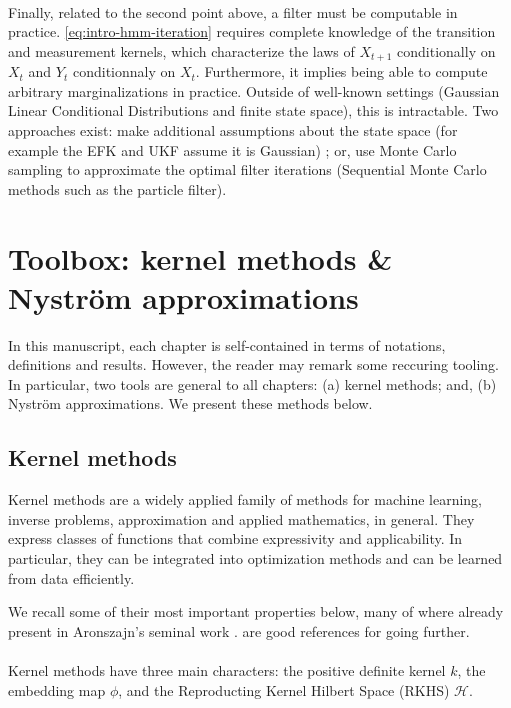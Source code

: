 \paragraph{} Finally, related to the second point above, a filter must be computable in practice. \cref{eq:intro-hmm-iteration} requires complete knowledge of the transition and measurement kernels, which characterize the laws of $X_{t+1}$ conditionally on $X_t$ and $Y_t$ conditionnaly on $X_t$. Furthermore, it implies being able to compute arbitrary marginalizations in practice. Outside of well-known settings (Gaussian Linear Conditional Distributions and finite state space), this is intractable. Two approaches exist: make additional assumptions about the state space (for example the EFK and UKF assume it is Gaussian) ; or, use Monte Carlo sampling to approximate the optimal filter iterations (Sequential Monte Carlo methods such as the particle filter).



\section{Toolbox: kernel methods \& Nyström approximations}\label{sec:tools}
In this manuscript, each chapter is self-contained in terms of notations, definitions and results. However, the reader may remark some reccuring tooling. In particular, two tools are general to all chapters: (a) kernel methods; and, (b) Nyström approximations. We present these methods below.

\subsection{Kernel methods}
Kernel methods are a widely applied family of methods for machine learning, inverse problems, approximation and applied mathematics, in general. They express classes of functions that combine expressivity and applicability. In particular, they can be integrated into optimization methods and can be learned from data efficiently.

We recall some of their most important properties below, many of where already present in Aronszajn's seminal work \citep{aronszajn1950theory}. \cite{shawe-taylor,scholkopf-kernels} are good references for going further.

\paragraph{}
Kernel methods have three main characters: the positive definite kernel $k$, the embedding map $\phi$, and the Reproducting Kernel Hilbert Space (RKHS) $\mathcal H$.


